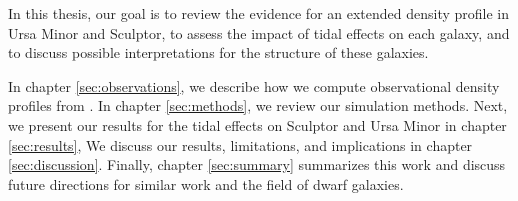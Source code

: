 In this thesis, our goal is to review the evidence for an extended
density profile in Ursa Minor and Sculptor, to assess the impact of
tidal effects on each galaxy, and to discuss possible interpretations
for the structure of these galaxies.

In chapter \ref{sec:observations}, we describe how we compute
observational density profiles from \citet{jensen+2024}. In chapter
\ref{sec:methods}, we review our simulation methods. Next, we present
our results for the tidal effects on Sculptor and Ursa Minor in chapter
\ref{sec:results}, We discuss our results, limitations, and implications
in chapter \ref{sec:discussion}. Finally, chapter \ref{sec:summary}
summarizes this work and discuss future directions for similar work and
the field of dwarf galaxies.
